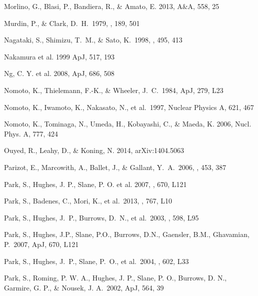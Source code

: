 \documentclass[11pt,a4paper]{article}
\begin{document}
{\begin{multicols}{2}
{\begin{thebibliography}{99}
Morlino, G., Blasi, P., Bandiera, R., \& Amato, E. 2013, A\&A, 558, 25


 Murdin, P., \& Clark,
  D.~H.\ 1979, \mnras, 189, 501

 Nagataki, S., Shimizu, 
T.~M., \& Sato, K.\ 1998, \apj, 495, 413 

 Nakamura et al. 1999 ApJ,
  517, 193

Ng, C. Y. et al. 2008, ApJ, 686, 508


 Nomoto, K., Thielemann,
F.-K., \& Wheeler, J.~C.\ 1984, ApJ, 279, L23

 Nomoto, K., Iwamoto, K., 
Nakasato, N., et al.\ 1997, Nuclear Physics A, 621, 467 

 Nomoto, K., 
Tominaga, N., Umeda, H., Kobayashi, C., \& Maeda,
K. 2006, Nucl. Phys. A, 777, 424

Ouyed, R., Leahy, D., \& Koning, N. 2014, arXiv:1404.5063

 Parizot, E., Marcowith, A.,
  Ballet, J., \& Gallant, Y.~A.\ 2006, \aap, 453, 387

 Park, S., Hughes, J. P., Slane, P. O. et al. 2007,
\apj, 670, L121

 Park, S., Badenes, C., 
Mori, K.,  et al.\ 2013, \apj, 767, L10 

 Park, S., Hughes, J.~P., Burrows,
  D.~N., et al.\ 2003, \apj, 598, L95

 Park, S., Hughes, J.P., Slane,
  P.O., Burrows, D.N., Gaensler, B.M., Ghavamian, P.\ 2007, ApJ, 670,
  L121

 Park, S., Hughes, J.~P., Slane,
  P.~O., et al.\ 2004, \apj, 602, L33

 Park, S., Roming, P. W. A.,
  Hughes, J. P., Slane, P. O., Burrows, D. N., Garmire, G. P., \&
  Nousek, J. A.\ 2002, ApJ, 564, 39


\end{thebibliography}}
\end{multicols}}
\end{document}
